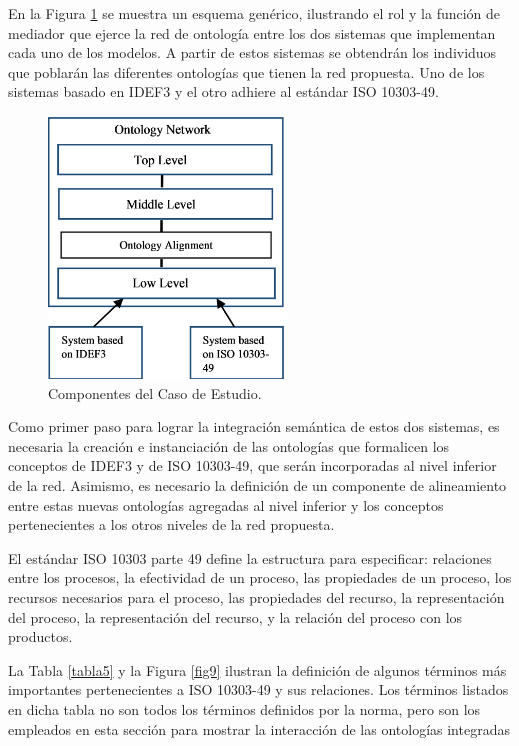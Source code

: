 \documentclass[journal]{IEEEtran}
\begin{document}
En la Figura \ref{fig8} se muestra un esquema gen\'erico, ilustrando el rol y la funci\'on de mediador que ejerce la red de ontolog\'ia entre los dos sistemas que implementan cada uno de los modelos. A partir de estos sistemas se obtendr\'an los individuos que poblar\'an las diferentes ontolog\'ias que tienen la red propuesta. Uno de los sistemas basado en IDEF3 y el otro adhiere al est\'andar ISO 10303-49.

\begin{figure}[!t]
\centering
\includegraphics[width=2.5in]{figures/figure8.png}
\caption{Componentes del Caso de Estudio.}
\label{fig8}
\end{figure}

Como primer paso para lograr la integraci\'on sem\'antica de estos dos sistemas, es necesaria la creaci\'on e instanciaci\'on de las ontolog\'ias que formalicen los conceptos de IDEF3 y de ISO 10303-49, que ser\'an incorporadas al nivel inferior de la red. Asimismo, es necesario la definici\'on de un componente de alineamiento entre estas nuevas ontolog\'ias agregadas al nivel inferior y los conceptos pertenecientes a los otros niveles de la red propuesta. 

El est\'andar ISO 10303 parte 49 define la estructura para especificar: relaciones entre los procesos, la efectividad de un proceso, las propiedades de un proceso, los recursos necesarios para el proceso, las propiedades del recurso, la representaci\'on del proceso, la representaci\'on del recurso, y la relaci\'on del proceso con los productos. 

La Tabla \ref{tabla5} y la Figura \ref{fig9} ilustran la definici\'on de algunos t\'erminos m\'as importantes pertenecientes a ISO 10303-49 y sus relaciones. Los t\'erminos listados en dicha tabla no son todos los t\'erminos definidos por la norma, pero son los empleados en esta secci\'on para mostrar la interacci\'on de las ontolog\'ias integradas
\end{document}
